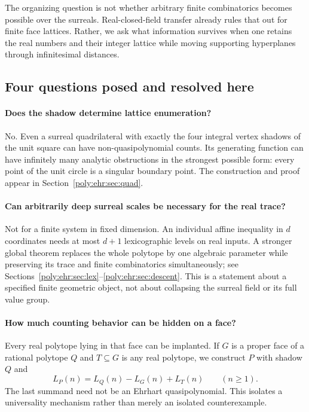\documentclass[11pt,a4paper]{article}
\numberwithin{equation}{section}
\theoremstyle{plain}
\begin{document}
The organizing question is not whether arbitrary finite combinatorics becomes
possible over the surreals. Real-closed-field transfer already rules that out
for finite face lattices. Rather, we ask what information survives when one
retains the real numbers and their integer lattice while moving supporting
hyperplanes through infinitesimal distances.

\subsection{Four questions posed and resolved here}

\paragraph{Does the shadow determine lattice enumeration?}
No. Even a surreal quadrilateral with exactly the four integral vertex shadows
of the unit square can have non-quasipolynomial counts. Its generating
function can have infinitely many analytic obstructions in the strongest
possible form: every point of the unit circle is a singular boundary point.
The construction and proof appear in Section~\ref{poly:ehr:sec:quad}.

\paragraph{Can arbitrarily deep surreal scales be necessary for the real trace?}
Not for a finite system in fixed dimension. An individual affine inequality
in $d$ coordinates needs at most $d+1$ lexicographic levels on real inputs.
A stronger global theorem replaces the whole polytope by one algebraic
parameter while preserving its trace and finite combinatorics simultaneously;
see Sections~\ref{poly:ehr:sec:lex}--\ref{poly:ehr:sec:descent}. This is a statement about a
specified finite geometric object, not about collapsing the surreal field
or its full value group.

\paragraph{How much counting behavior can be hidden on a face?}
Every real polytope lying in that face can be implanted. If $G$ is a proper
face of a rational polytope $Q$ and $T\subseteq G$ is any real polytope, we
construct $P$ with shadow $Q$ and
\[
 L_P(n)=L_Q(n)-L_G(n)+L_T(n)\qquad(n\geq1).
\]
The last summand need not be an Ehrhart quasipolynomial. This isolates a
universality mechanism rather than merely an isolated counterexample.
\end{document}

